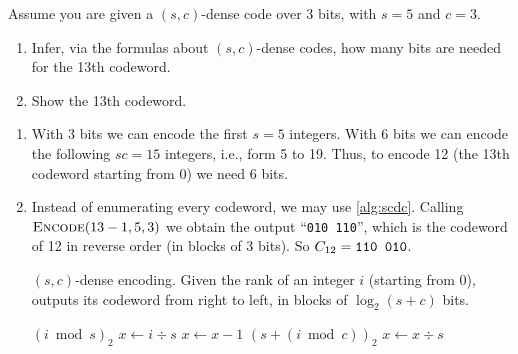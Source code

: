 \exercise

Assume you are given a $(s,c)$-dense code over 3 bits, with $s = 5$ and $c = 3$.
%
\begin{enumerate}

  \item Infer, via the formulas about $(s,c)$-dense codes, how many bits are
  needed for the 13th codeword.

  \item Show the 13th codeword.

\end{enumerate}

\solution

\begin{enumerate}

  \item With 3 bits we can encode the first $s = 5$ integers. With 6 bits we can
  encode the following $sc = 15$ integers, i.e., form 5 to 19. Thus, to encode
  12 (the 13th codeword starting from 0) we need 6 bits.

  \item Instead of enumerating every codeword, we may use \autoref{alg:scdc}.
  Calling $\text{\sc Encode}(13 - 1, 5, 3)$ we obtain the output ``{\tt 010
  110}'', which is the codeword of 12 in reverse order (in blocks of 3 bits). So
  $C_{12} = \text{\tt 110 010}$.
  \begin{algorithm}[t]

  \caption{$(s,c)$-dense encoding\protect\footnotemark. Given the rank of an
  integer $i$ (starting from 0), outputs its codeword from right to left, in
  blocks of $\log_2 (s + c)$ bits.}

  \label{alg:scdc}

  \begin{algorithmic}[1]
     $(i \bmod s)_2$
    \State $x \gets i \div s$
      \State $x \gets x - 1$
       $(s + (i \bmod c))_2$
      \State $x \gets x \div s$
    \EndWhile
  \EndProcedure
  \end{algorithmic}
  \end{algorithm}

\end{enumerate}
